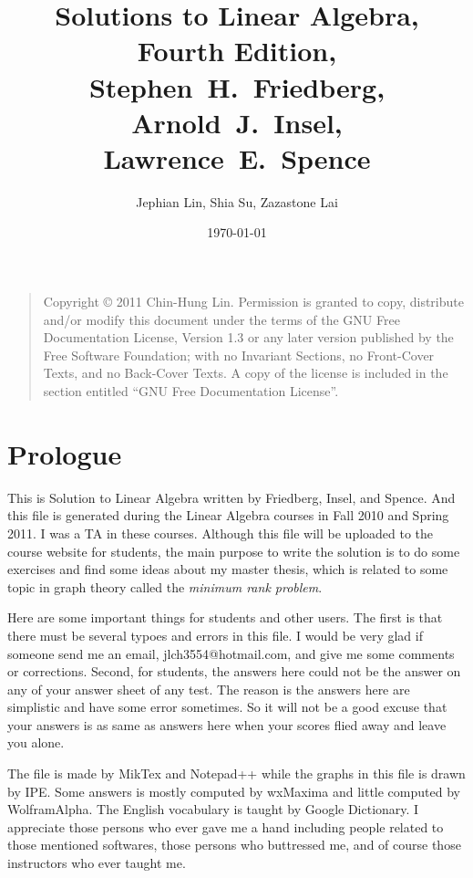 \documentclass{report}
\title{Solutions to Linear Algebra, Fourth Edition,\\ Stephen~H.~Friedberg, Arnold~J.~Insel, Lawrence~E.~Spence}
\author{Jephian Lin, Shia Su, Zazastone Lai}
\date{\today}
\theoremstyle{definition}
\begin{document}
\maketitle


\begin{quote}
    Copyright \copyright{}  2011  Chin-Hung Lin.
    Permission is granted to copy, distribute and/or modify this document
    under the terms of the GNU Free Documentation License, Version 1.3
    or any later version published by the Free Software Foundation;
    with no Invariant Sections, no Front-Cover Texts, and no Back-Cover Texts.
    A copy of the license is included in the section entitled ``GNU
    Free Documentation License''.
\end{quote}



\chapter*{Prologue}
This is Solution to Linear Algebra written by Friedberg, Insel, and Spence. And this file is generated during the Linear Algebra courses in Fall 2010 and Spring 2011. I was a TA in these courses. Although this file will be uploaded to the course website for students, the main purpose to write the solution is to do some exercises and find some ideas about my master thesis, which is related to some topic in graph theory called the \textit{minimum rank problem}. 

Here are some important things for students and other users. The first is that there must be several typoes and errors in this file. I would be very glad if someone send me an email, jlch3554@hotmail.com, and give me some comments or corrections. Second, for students, the answers here could not be the answer on any of your answer sheet of any test. The reason is the answers here are simplistic and have some error sometimes. So it will not be a good excuse that your answers is as same as answers here when your scores flied away and leave you alone.

The file is made by MikTex and Notepad++ while the graphs in this file is drawn by IPE. Some answers is mostly computed by wxMaxima and little computed by WolframAlpha. The English vocabulary is taught by Google Dictionary. I appreciate those persons who ever gave me a hand including people related to those mentioned softwares, those persons who buttressed me, and of course those instructors who ever taught me. 
\end{document}
